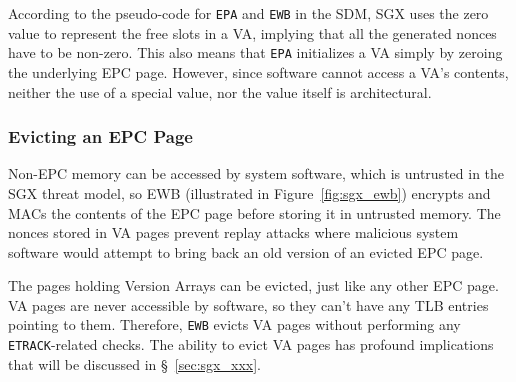 
According to the pseudo-code for \texttt{EPA} and \texttt{EWB} in the SDM, SGX
uses the zero value to represent the free slots in a VA, implying that all the
generated nonces have to be non-zero. This also means that \texttt{EPA}
initializes a VA simply by zeroing the underlying EPC page. However, since
software cannot access a VA's contents, neither the use of a special value, nor
the value itself is architectural.


\subsubsection{Evicting an EPC Page}
\label{sec:sgx_ewb}

Non-EPC memory can be accessed by system software, which is untrusted in the
SGX threat model, so EWB (illustrated in Figure~\ref{fig:sgx_ewb}) encrypts and
MACs the contents of the EPC page before storing it in untrusted memory. The
nonces stored in VA pages prevent replay attacks where malicious system
software would attempt to bring back an old version of an evicted EPC page.



The pages holding Version Arrays can be evicted, just like any other EPC page.
VA pages are never accessible by software, so they can't have any TLB entries
pointing to them. Therefore, \texttt{EWB} evicts VA pages without performing
any \texttt{ETRACK}-related checks. The ability to evict VA pages has profound
implications that will be discussed in \S~\ref{sec:sgx_xxx}.



